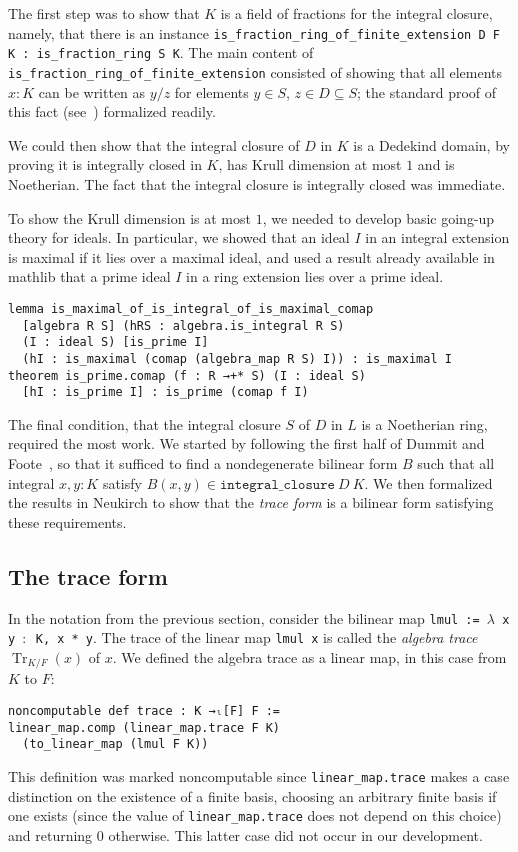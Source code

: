 \documentclass[sn-mathphys]{sn-jnl}%
\newcommand{\lean}[1]{\texttt{#1}\xspace}
\DeclareMathOperator{\Tr}{Tr}
\newcommand{\mathlib}{\textsf{mathlib}\xspace}
\begin{document}
The first step was to show that $K$ is a field of fractions for the integral closure, namely, that there is an instance \lean{is\_fraction\_ring\_of\_finite\_extension D F K : is\_fraction\_ring S K}.
The main content of \lean{is\_fraction\_ring\_\-of\-\_finite\-\_extension} consisted of showing that all elements $x : K$ can be written as $y / z$ for elements $y \in S$, $z \in D \subseteq S$;
the standard proof of this fact (see~\cite[Theorem~15.29]{Dummit-and-Foote}) formalized readily.

We could then show that the integral closure of $D$ in $K$ is a Dedekind domain,
by proving it is integrally closed in $K$, has Krull dimension at most $1$ and is Noetherian.
The fact that the integral closure is integrally closed was immediate.

To show the Krull dimension is at most $1$, we needed to develop basic going-up theory for ideals.
In particular, we showed that an ideal $I$ in an integral extension is maximal if it lies over a maximal ideal,
and used a result already available in \mathlib that a prime ideal $I$ in a ring extension lies over a prime ideal.
\begin{lstlisting}
lemma is_maximal_of_is_integral_of_is_maximal_comap
  [algebra R S] (hRS : algebra.is_integral R S)
  (I : ideal S) [is_prime I]
  (hI : is_maximal (comap (algebra_map R S) I)) : is_maximal I
theorem is_prime.comap (f : R →+* S) (I : ideal S)
  [hI : is_prime I] : is_prime (comap f I)
\end{lstlisting}

The final condition, that the integral closure $S$ of $D$ in $L$ is a Noetherian ring, required the most work.
We started by following the first half of Dummit and Foote~\cite[Theorem~15.29]{Dummit-and-Foote},
so that it sufficed to find a nondegenerate bilinear form $B$ such that all integral $x, y : K$ satisfy $B(x, y) \in \lean{integral\_closure}\ D\ K$.
We then formalized the results in Neukirch \cite[Sections~2.5--2.8]{Neukirch} to show that the \emph{trace form} is a bilinear form satisfying these requirements.

\subsection{The trace form}\label{sec:trace-form}
In the notation from the previous section, consider the bilinear map \lean{lmul := $\lambda$ x y $:$ K, x~*~y}.
The trace of the linear map \lean{lmul x} is called the \emph{algebra trace} $\Tr_{K / F}(x)$ of $x$.
We defined the algebra trace
as a linear map, in this case from $K$ to $F$:
\begin{lstlisting}
noncomputable def trace : K →ₗ[F] F :=
linear_map.comp (linear_map.trace F K)
  (to_linear_map (lmul F K))
\end{lstlisting}
This definition was marked noncomputable since \lean{linear\_map.trace} makes a case distinction on the existence of a finite basis,
choosing an arbitrary finite basis if one exists (since the value of \lean{linear\_map.trace} does not depend on this choice)
and returning $0$ otherwise.
This latter case did not occur in our development.
\end{document}

